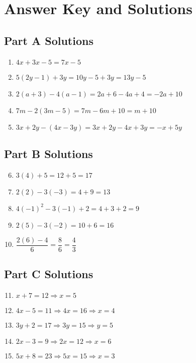 \documentclass[14pt]{extarticle}
\begin{document}
\section*{Answer Key and Solutions}

\subsection*{Part A Solutions}
\begin{enumerate}
    \item \(4x + 3x - 5 = 7x - 5\)
    \item \(5(2y - 1) + 3y = 10y - 5 + 3y = 13y - 5\)
    \item \(2(a + 3) - 4(a - 1) = 2a + 6 - 4a + 4 = -2a + 10\)
    \item \(7m - 2(3m - 5) = 7m - 6m + 10 = m + 10\)
    \item \(3x + 2y - (4x - 3y) = 3x + 2y - 4x + 3y = -x + 5y\)
\end{enumerate}

\subsection*{Part B Solutions}
\begin{enumerate}
    \setcounter{enumi}{5}
    \item \(3(4) + 5 = 12 + 5 = 17\)
    \item \(2(2) - 3(-3) = 4 + 9 = 13\)
    \item \(4(-1)^2 - 3(-1) + 2 = 4 + 3 + 2 = 9\)
    \item \(2(5) - 3(-2) = 10 + 6 = 16\)
    \item \(\dfrac{2(6) - 4}{6} = \dfrac{8}{6} = \dfrac{4}{3}\)
\end{enumerate}

\subsection*{Part C Solutions}
\begin{enumerate}
    \setcounter{enumi}{10}
    \item \(x + 7 = 12 \Rightarrow x = 5\)
    \item \(4x - 5 = 11 \Rightarrow 4x = 16 \Rightarrow x = 4\)
    \item \(3y + 2 = 17 \Rightarrow 3y = 15 \Rightarrow y = 5\)
    \item \(2x - 3 = 9 \Rightarrow 2x = 12 \Rightarrow x = 6\)
    \item \(5x + 8 = 23 \Rightarrow 5x = 15 \Rightarrow x = 3\)
\end{enumerate}
\end{document}
